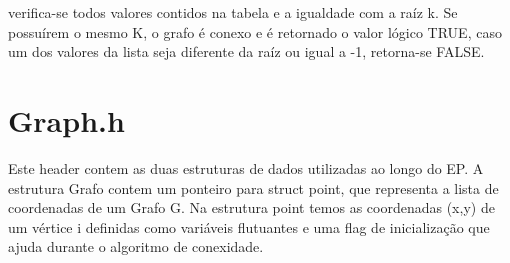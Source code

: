 \documentclass[a4paper,11pt]{article}
\begin{document}
verifica-se todos valores contidos na tabela e a igualdade com a raíz k. Se possuírem o mesmo K, o grafo é conexo e é retornado o valor lógico TRUE, caso um dos valores da lista seja diferente da raíz ou igual a -1, retorna-se FALSE.

\section{Graph.h}
Este header contem as duas estruturas de dados utilizadas ao longo do EP. A estrutura Grafo contem um ponteiro para struct point, que representa a lista de coordenadas de um Grafo G. Na estrutura point temos as coordenadas (x,y) de um vértice i definidas como variáveis flutuantes e uma flag de inicialização que ajuda durante o algoritmo de conexidade.
\end{document}
